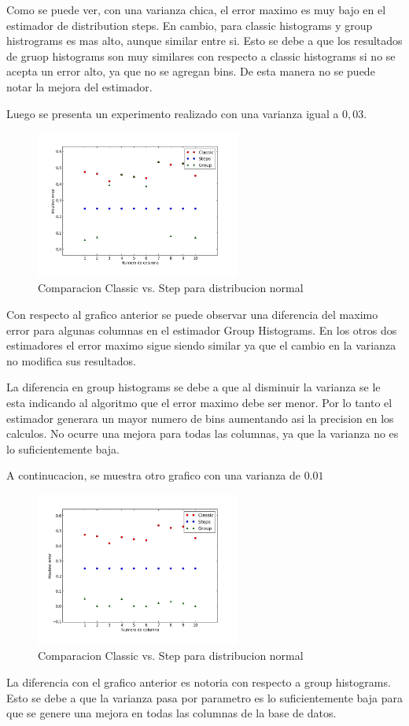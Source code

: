 \documentclass[10pt, a4paper,english,spanish,hidelinks]{article}
\begin{document}
Como se puede ver, con una varianza chica, el error maximo es muy bajo en el estimador de distribution steps. En cambio, para classic histograms y group histrograms es mas alto, aunque similar entre si. Esto se debe a que los resultados de gruop histograms son muy similares con respecto a classic histograms si no se acepta un error alto, ya que no se agregan bins. De esta manera no se puede notar la mejora del estimador.


Luego se presenta un experimento realizado con una varianza igual a $0,03$. 

\begin{figure}
  \centering
  \includegraphics[width=0.6\textwidth]{./imagenes/ejb2_normal_t_003.png}
  \caption{Comparacion Classic vs. Step para distribucion normal}
\end{figure}

Con respecto al grafico anterior se puede observar una diferencia del maximo error para algunas columnas en el estimador Group Histograms. En los otros dos estimadores el error maximo sigue siendo similar ya que el cambio en la varianza no modifica sus resultados. 

La diferencia en group histograms se debe a que al disminuir la varianza se le esta indicando al algoritmo que el error maximo debe ser menor. Por lo tanto el estimador generara un mayor numero de bins aumentando asi la precision en los calculos. No ocurre una mejora para todas las columnas, ya que la varianza no es lo suficientemente baja. 


A continucacion, se muestra otro grafico con una varianza de $0.01$

\begin{figure}
  \centering
  \includegraphics[width=0.6\textwidth]{./imagenes/ejb2_normal_t_001.png}
  \caption{Comparacion Classic vs. Step para distribucion normal}
\end{figure}

La diferencia con el grafico anterior es notoria con respecto a group histograms. Esto se debe a que la varianza pasa por parametro es lo suficientemente baja para que se genere una mejora en todas las columnas de la base de datos. 
\end{document}
